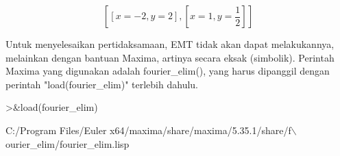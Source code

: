 \documentclass[12pt,arial,letterpaper]{book}
\begin{document}
\begin{eulercomment}
\begin{eulercomment}
\begin{eulerformula}
\[
\left[ \left[ x=-2 , y=2 \right]  , \left[ x=1 , y=\frac{1}{2}
  \right]  \right] 
\]
\end{eulerformula}
\begin{eulercomment}
Untuk menyelesaikan pertidaksamaan, EMT tidak akan dapat melakukannya,
melainkan dengan bantuan Maxima, artinya secara eksak (simbolik).
Perintah Maxima yang digunakan adalah fourier\_elim(), yang harus
dipanggil dengan perintah "load(fourier\_elim)" terlebih dahulu.
\end{eulercomment}
\begin{eulerprompt}
>&load(fourier_elim)
\end{eulerprompt}
\begin{euleroutput}
  
          C:/Program Files/Euler x64/maxima/share/maxima/5.35.1/share/f\(\backslash\)
  ourier_elim/fourier_elim.lisp
  

\end{euleroutput}
\end{eulercomment}
\end{eulercomment}
\end{document}
